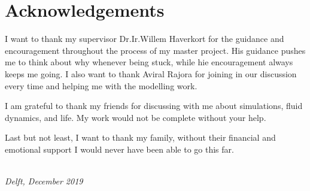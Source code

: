 \chapter*{Acknowledgements}

I want to thank my supervisor Dr.Ir.Willem Haverkort for the guidance and encouragement throughout the process of my master project. His guidance pushes me to think about why whenever being stuck, while hie encouragement always keeps me going. I also want to thank Aviral Rajora for joining in our discussion every time and helping me with the modelling work. 

I am grateful to thank my friends for discussing with me about simulations, fluid dynamics, and life. My work would not be complete without your help.

Last but not least, I want to thank my family, without their financial and emotional support I would never have been able to go this far.
\begin{flushright}
{\makeatletter\itshape
    \@author \\
    Delft, December 2019
\makeatother}
\end{flushright}

